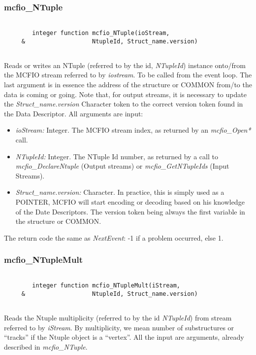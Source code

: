 \subsubsection{mcfio\_NTuple}

\begin{verbatim}

        integer function mcfio_NTuple(ioStream,
     &                   NtupleId, Struct_name.version)
     
\end{verbatim}

	Reads or writes an NTuple (referred to by the id, {\em NTupleId}) 
instance onto/from the MCFIO stream referred to by {\em iostream}. To be called 
from the event loop. The last argument is in essence the address of the 
structure or COMMON from/to the data is coming or going. Note that, for 
output streams, it is necessary to update the {\em Struct\_name.version} 
Character token to the correct version token found in the Data Descriptor.
All arguments are input: 

\begin{itemize}
\item {\em ioStream:} Integer. The MCFIO stream index, as returned by an {\em
mcfio\_Open*} call. 
\item {\em NTupleId:} Integer. The NTuple Id number, as returned by a call to
{\em mcfio\_DeclareNtuple} (Output streams) or {\em mcfio\_GetNTupleIds} 
(Input Streams). 
\item {\em Struct\_name.version:} Character. In practice, this is simply used
as a POINTER, MCFIO will start encoding or decoding based on his knowledge 
of the Date Descriptors.  The version token being always the first variable
in the structure or COMMON.  
\end{itemize}	
	The return code the same as {\em NextEvent}: -1 if a problem occurred,
else 1. 

\subsubsection{mcfio\_NTupleMult}

\begin{verbatim}

        integer function mcfio_NTupleMult(iStream,
     &                   NtupleId, Struct_name.version)
     
\end{verbatim}

	Reads the Ntuple multiplicity (referred to by the id {\em NTupleId}) 
from stream referred to by {\em iStream}.  By multiplicity, we mean number of 
substructures or ``tracks'' if the Ntuple object is a ``vertex''.  All 
the input are arguments, already described in {\em mcfio\_NTuple}. 

